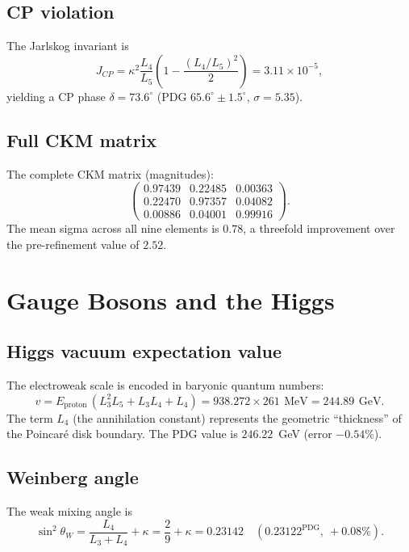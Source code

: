 \documentclass[aps,prd,reprint,twocolumn,showpacs,superscriptaddress]{revtex4-2}
\newcommand{\mev}{\,\text{MeV}}
\newcommand{\gev}{\,\text{GeV}}
\newcommand{\PDG}[1]{\ensuremath{#1^{\text{PDG}}}}
\begin{document}
\subsection{CP violation}

The Jarlskog invariant is
\begin{equation}
J_{CP} = \kappa^2 \frac{L_4}{L_5}
         \left(1 - \frac{(L_4/L_5)^2}{2}\right)
       = 3.11 \times 10^{-5},
\end{equation}
yielding a CP phase $\delta = 73.6^\circ$ (PDG $65.6^\circ \pm 1.5^\circ$,
$\sigma = 5.35$).

\subsection{Full CKM matrix}

The complete CKM matrix (magnitudes):
\[
\begin{pmatrix}
0.97439 & 0.22485 & 0.00363 \\
0.22470 & 0.97357 & 0.04082 \\
0.00886 & 0.04001 & 0.99916
\end{pmatrix}.
\]
The mean sigma across all nine elements is $0.78$, a
threefold improvement over the pre-refinement value of $2.52$.

\section{Gauge Bosons and the Higgs}
\label{sec:gauge}

\subsection{Higgs vacuum expectation value}

The electroweak scale is encoded in baryonic quantum numbers:
\begin{equation}
v = E_{\text{proton}}\,(L_3^2 L_5 + L_3 L_4 + L_4)
  = 938.272 \times 261\ \mev
  = 244.89\ \gev.
\end{equation}
The term $L_4$ (the annihilation constant) represents the geometric
``thickness'' of the Poincar\'{e} disk boundary.  The PDG value is
$246.22$~GeV (error $-0.54\%$).

\subsection{Weinberg angle}

The weak mixing angle is
\begin{equation}
\sin^2\theta_W = \frac{L_4}{L_3 + L_4} + \kappa
               = \frac{2}{9} + \kappa
               = 0.23142
               \quad (\PDG{0.23122},\ +0.08\%).
\end{equation}
\end{document}
